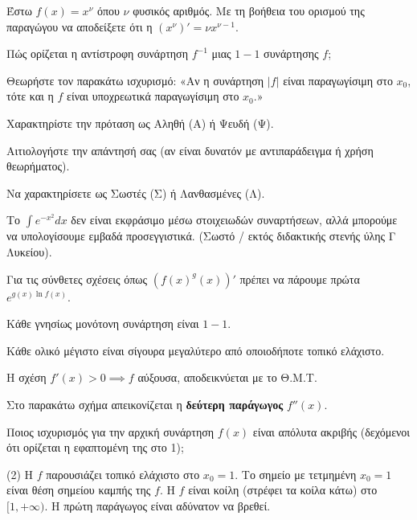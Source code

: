 \documentclass[11pt,a4paper]{article}
\newcommand{\kerkissans}[1]{{\fontfamily{maksf}\selectfont \textbf{#1}}}
\renewcommand{\textdexiakeraia}{}
\newcommand\themanum{A}
\newcounter{thema}[section]
\renewcommand{\thethema}{\arabic{thema}}
\newcommand{\Thema}{\refstepcounter{thema}{\textbf{\textcolor{black}{\faPenSquare\ \  \large \kerkissans{\textbf{\thethemaο\hspace{2mm}Διαγώνισμα - Θέμα \themanum}}}}}\hspace{0mm}}{}
\newenvironment{thema}[1]
{\begin{tcolorbox}[title=\Thema\kerkissans{\textbf{\large{  #1}}},breakable,
enhanced standard,titlerule=0pt,toprule=0pt, rightrule=0pt, bottomrule=0pt,
colback=white,left=0mm,top=1mm,bottom=0mm,
boxrule=0pt,
colframe=white,leftrule=0mm,sharp corners,coltitle=black]
\renewcommand{\themanum}{#1}}
{\end{tcolorbox}}
\begin{document}
\begin{thema}{A}
\begin{erwthma}
    \item Έστω $f(x) = x^\nu$ όπου $\nu$ φυσικός αριθμός. Με τη βοήθεια του ορισμού της παραγώγου να αποδείξετε ότι η $(x^\nu)' = \nu x^{\nu - 1}$.
    \item Πώς ορίζεται η αντίστροφη συνάρτηση $f^{-1}$ μιας $1-1$ συνάρτησης $f$;
    \item Θεωρήστε τον παρακάτω ισχυρισμό:
    «Αν η συνάρτηση $|f|$ είναι παραγωγίσιμη στο $x_0$, τότε και η $f$ είναι υποχρεωτικά παραγωγίσιμη στο $x_0$.»
    \begin{alist}
    \item Χαρακτηρίστε την πρόταση ως Αληθή (Α) ή Ψευδή (Ψ).
    \item Αιτιολογήστε την απάντησή σας (αν είναι δυνατόν με αντιπαράδειγμα ή χρήση θεωρήματος).
    \end{alist}
    \item Να χαρακτηρίσετε ως Σωστές (Σ) ή Λανθασμένες (Λ).
    \begin{alist}
        \item Το $\int e^{-x^2} dx$ δεν είναι εκφράσιμο μέσω στοιχειωδών συναρτήσεων, αλλά μπορούμε να υπολογίσουμε εμβαδά προσεγγιστικά. (Σωστό / εκτός διδακτικής στενής ύλης Γ Λυκείου).
        \item Για τις σύνθετες σχέσεις όπως $(f(x)^g(x))'$ πρέπει να πάρουμε πρώτα $e^{g(x)\ln f(x)}$.
        \item Κάθε γνησίως μονότονη συνάρτηση είναι $1-1$.
        \item Κάθε ολικό μέγιστο είναι σίγουρα μεγαλύτερο από οποιοδήποτε τοπικό ελάχιστο.
        \item Η σχέση $f'(x)>0 \implies f$ αύξουσα, αποδεικνύεται με το Θ.Μ.Τ.
    \end{alist}
    \item Στο παρακάτω σχήμα απεικονίζεται η \textbf{δεύτερη παράγωγος} $f''(x)$. 
    \begin{center}
    \end{center}
    Ποιος ισχυρισμός για την αρχική συνάρτηση $f(x)$ είναι απόλυτα ακριβής (δεχόμενοι ότι ορίζεται η εφαπτομένη της στο 1);
    \begin{tasks}[label=\let\textdexiakeraia\relax\alph*.](2)
        \task Η $f$ παρουσιάζει τοπικό ελάχιστο στο $x_0 = 1$.
        \task Το σημείο με τετμημένη $x_0 = 1$ είναι θέση σημείου καμπής της $f$.
        \task Η $f$ είναι κοίλη (στρέφει τα κοίλα κάτω) στο $[1, +\infty)$.
        \task Η πρώτη παράγωγος είναι αδύνατον να βρεθεί.
    \end{tasks}
\end{erwthma}
\end{thema}
\end{document}
